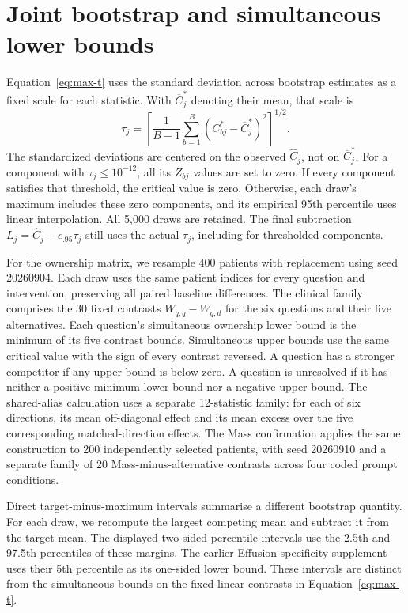 \documentclass{article}
\begin{document}
\FloatBarrier

\section{Joint bootstrap and simultaneous lower bounds}
\label{app:simultaneous-bounds}

Equation~\ref{eq:max-t} uses the standard deviation across bootstrap
estimates as a fixed scale for each statistic. With $\overline C^*_j$
denoting their mean, that scale is
\begin{equation}
\tau_j=\left[\frac{1}{B-1}\sum_{b=1}^{B}
       (C^*_{bj}-\overline C^*_j)^2\right]^{1/2}.
\label{eq:bootstrap-scale}
\end{equation}
The standardized deviations are centered on the observed $\widehat C_j$,
not on $\overline C^*_j$. For a component with $\tau_j\leq10^{-12}$,
all its $Z_{bj}$ values are set to zero. If every component satisfies
that threshold, the critical value is zero. Otherwise, each draw's
maximum includes these zero components, and its empirical 95th percentile
uses linear interpolation. All 5,000 draws are retained. The final
subtraction $L_j=\widehat C_j-c_{.95}\tau_j$ still uses the actual $\tau_j$,
including for thresholded components.

For the ownership matrix, we resample 400 patients with replacement using seed 20260904. Each draw uses the same patient indices for every question and intervention, preserving all paired baseline differences. The clinical family comprises the 30 fixed contrasts $W_{q,q}-W_{q,d}$ for the six questions and their five alternatives. Each question's simultaneous ownership lower bound is the minimum of its five contrast bounds. Simultaneous upper bounds use the same critical value with the sign of every contrast reversed. A question has a stronger competitor if any upper bound is below zero. A question is unresolved if it has neither a positive minimum lower bound nor a negative upper bound. The shared-alias calculation uses a separate 12-statistic family: for each of six directions, its mean off-diagonal effect and its mean excess over the five corresponding matched-direction effects. The Mass confirmation applies the same construction to 200 independently selected patients, with seed 20260910 and a separate family of 20 Mass-minus-alternative contrasts across four coded prompt conditions.

Direct target-minus-maximum intervals summarise a different bootstrap quantity. For each draw, we recompute the largest competing mean and subtract it from the target mean. The displayed two-sided percentile intervals use the 2.5th and 97.5th percentiles of these margins. The earlier Effusion specificity supplement uses their 5th percentile as its one-sided lower bound. These intervals are distinct from the simultaneous bounds on the fixed linear contrasts in Equation~\ref{eq:max-t}.
\end{document}
